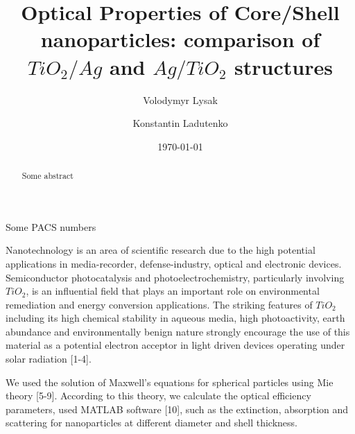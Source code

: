 \documentclass[aip,jap,reprint]{revtex4-1}
\begin{document}
\title{Optical Properties of Core/Shell nanoparticles: comparison of $TiO_{2}/Ag$  and
$Ag/TiO_{2}$ structures}
\author{Volodymyr Lysak}
\author{Konstantin Ladutenko}
\date{\today}
\begin{abstract}
  Some abstract
\end{abstract}

\pacs%
{ Some PACS numbers}
\maketitle %

Nanotechnology is an area of scientific research due to the high
potential applications in media-recorder, defense-industry, optical and
electronic devices. Semiconductor photocatalysis and
photoelectrochemistry, particularly involving $TiO_2$, is an influential
field that plays an important role on environmental remediation and
energy conversion applications. The striking features of $TiO_2$ including
its high chemical stability in aqueous media, high photoactivity, earth
abundance and environmentally benign nature strongly encourage the use
of this material as a potential electron acceptor in light driven
devices operating under solar radiation [1-4]. 

We used the solution of Maxwell's equations for
spherical particles using Mie theory [5-9]. According to this theory,
we calculate the optical efficiency parameters, used MATLAB software
[10], such as the extinction, absorption and scattering for
nanoparticles at different diameter and shell thickness.
\end{document}
